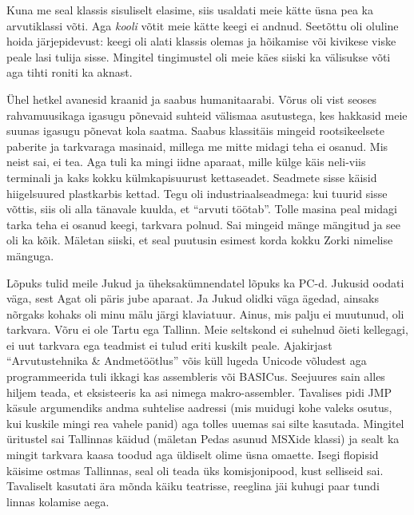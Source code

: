 Kuna me seal klassis sisuliselt elasime, siis usaldati meie kätte üsna pea ka 
arvutiklassi võti. Aga \emph{kooli} võtit meie kätte keegi ei andnud. Seetõttu 
oli oluline hoida järjepidevust: keegi oli alati klassis olemas ja hõikamise 
või kivikese viske peale lasi tulija sisse. Mingitel tingimustel oli meie käes 
siiski ka välisukse võti aga tihti roniti ka aknast. 

Ühel hetkel avanesid kraanid ja saabus humanitaarabi. Võrus oli vist seoses 
rahvamuusikaga igasugu põnevaid suhteid välismaa asutustega, kes hakkasid meie 
suunas igasugu põnevat kola saatma. Saabus klassitäis mingeid rootsikeelsete 
paberite ja tarkvaraga masinaid, millega me mitte midagi teha ei osanud. Mis 
neist sai, ei tea. Aga tuli ka mingi iidne aparaat, mille külge käis neli-viis 
terminali ja kaks kokku külmkapisuurust kettaseadet. Seadmete sisse käisid 
hiigelsuured plastkarbis kettad. Tegu oli industriaalseadmega: kui tuurid sisse 
võttis, siis oli alla tänavale kuulda, et \enquote{arvuti töötab}. Tolle masina 
peal midagi tarka teha ei osanud keegi, tarkvara polnud. Sai mingeid mänge 
mängitud ja see oli ka kõik. Mäletan siiski, et seal puutusin esimest korda 
kokku Zorki nimelise mänguga.

Lõpuks tulid meile Jukud ja üheksakümnendatel lõpuks ka 
PC-d. Jukusid oodati väga, sest Agat oli päris jube aparaat. 
Ja Jukud olidki väga ägedad, ainsaks nõrgaks kohaks oli minu mälu järgi 
klaviatuur. Ainus, mis palju ei muutunud, oli tarkvara. Võru ei ole Tartu ega 
Tallinn. Meie seltskond ei suhelnud õieti kellegagi, ei uut tarkvara ega 
teadmist ei tulud eriti kuskilt peale. Ajakirjast \enquote{Arvutustehnika \& 
Andmetöötlus} võis küll lugeda Unicode võludest aga programmeerida tuli ikkagi 
kas assembleris või BASICus. Seejuures sain alles hiljem teada, et eksisteeris 
ka asi nimega makro-assembler. Tavalises pidi JMP käsule argumendiks andma 
suhtelise aadressi (mis muidugi kohe valeks osutus, kui kuskile mingi rea 
vahele panid) aga tolles 
uuemas sai silte kasutada. Mingitel üritustel sai Tallinnas käidud (mäletan 
Pedas asunud MSXide klassi) 
ja sealt ka mingit tarkvara kaasa toodud aga üldiselt olime üsna omaette. Isegi 
flopisid käisime ostmas Tallinnas, seal oli teada üks komisjonipood, kust 
selliseid sai. Tavaliselt kasutati ära mõnda käiku teatrisse, reeglina jäi 
kuhugi paar tundi linnas kolamise aega. 

